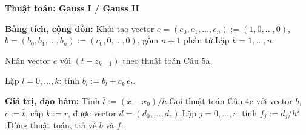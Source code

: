 \documentclass[11pt,a4paper]{article}
\newenvironment{thuattoan}[1]
  {\par\medskip\noindent\textbf{Thuật toán: #1}\begin{description}[style=standard,align=left,leftmargin=4.3em,labelwidth=3.9em,labelsep=0.4em,itemsep=1pt,topsep=3pt,font=\normalfont\bfseries]}
  {\end{description}}
\newenvironment{con}
  {\begin{description}[style=standard,align=left,leftmargin=2.1em,labelwidth=1.8em,labelsep=0.3em,itemsep=0pt,topsep=1pt,font=\normalfont]}
  {\end{description}}
\begin{document}
\begin{thuattoan}{Gauss I / Gauss II}
\item[Bước 4:] \textbf{Bảng tích, cộng dồn:} Khởi tạo vector $e=(e_0,e_1,\dots,e_n):=(1,0,\dots,0)$, $b=(b_0,b_1,\dots,b_n):=(c_0,0,\dots,0)$, gồm $n+1$ phần tử.\newline Lặp $k=1,\dots,n$:
  \begin{con}
  \item[4.1:] Nhân vector $e$ với $(t-z_{k-1})$ theo thuật toán Câu 5a.
  \item[4.2:] Lặp $l=0,\dots,k$: tính $b_l:=b_l+c_k\,e_l$.
  \end{con}
\item[Bước 5:] \textbf{Giá trị, đạo hàm:} Tính $\bar t:=(\bar x-x_0)/h$.\newline Gọi thuật toán Câu 4c với vector $b$, $c:=\bar t$, cấp $k:=r$, được vector $d=(d_0,\dots,d_r)$.\newline Lặp $j=0,\dots,r$: tính $f_j:=d_j/h^j$.\newline Dừng thuật toán, trả về $b$ và $f$.
\end{thuattoan}
\end{document}
